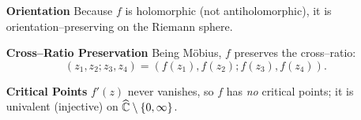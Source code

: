 \documentclass[12pt]{article}
\theoremstyle{definition} %
\theoremstyle{plain} %
\begin{document}
\begin{itemize}
   \item[\textbf{Orientation}] 
         Because \(f\) is holomorphic (not antiholomorphic),
         it is orientation–preserving on the Riemann sphere.
   
   \item[\textbf{Cross–Ratio Preservation}] 
         Being Möbius, \(f\) preserves the cross–ratio:
         \[
           (z_{1},z_{2};z_{3},z_{4})
             =(f(z_{1}),f(z_{2});f(z_{3}),f(z_{4})).
         \]
   
   \item[\textbf{Critical Points}] 
         \(f'(z)\) never vanishes, so \(f\) has \emph{no} critical
         points; it is univalent (injective) on
         \(\widehat{\Bbb C}\setminus\{0,\infty\}\).
   
   \end{itemize}
   
\end{document}
